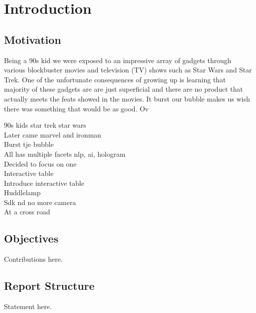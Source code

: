 
\chapter{Introduction}

\section{Motivation}
Being a 90s kid we were exposed to an impressive array of gadgets through various blockbuster movies and television (TV) shows such as Star Wars and Star Trek. One of the unfortunate consequences of growing up is learning that majority of these gadgets are are just superficial and there are no product that actually meets the feats showed in the movies. It burst our bubble makes us wish there was something that would be as good. Ov

90s kids star trek star wars \\
Later came marvel and ironman\\
Burst tje bubble\\
All has multiple facets nlp, ai, hologram\\
Decided to focus on one\\
Interactive table\\
Introduce interactive table\\
Huddlelamp\\
Sdk nd no more camera\\
At a cross road\\




\section{Objectives}

Contributions here.


\section{Report Structure}

Statement here.

